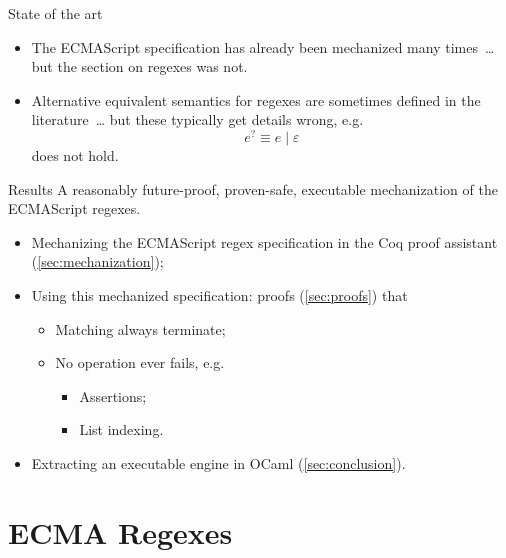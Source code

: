 \documentclass[aspectratio=169]{beamer}
\newcommand{\eps}[0]{\varepsilon}
\newcommand{\disj}[0]{\mathbin{|}}
\newcommand{\question}[0]{^{?}}
\begin{document}
    \begin{frame}{State of the art}
        \begin{itemize}
            \item The ECMAScript specification has already been mechanized many times~\cite{jscert,lambdajs,aplas_js,kjs}\ldots{}
            \pause{}
            but the section on regexes was not.
            \pause{}
            \item Alternative equivalent semantics for regexes are sometimes defined in the literature~\cite{expose,repair_dos}\ldots{}
            \pause{}
            but these typically get details wrong, e.g.
            \[e\question{} \equiv{} e \disj{} \eps{} \]
            does not hold.
        \end{itemize}
    \end{frame}

    \begin{frame}{Results}
        A reasonably future-proof, proven-safe, executable mechanization of the ECMAScript regexes.
        \pause{}
        \begin{itemize}
            \item Mechanizing the ECMAScript regex specification in the Coq proof assistant (\cref{sec:mechanization});
            \pause{}
            \item Using this mechanized specification: proofs (\cref{sec:proofs}) that
                \begin{itemize}
                    \item Matching always terminate;
                    \item No operation ever fails, e.g.
                        \begin{itemize}
                            \item Assertions;
                            \item List indexing.
                        \end{itemize}
                \end{itemize}
            \pause{}
            \item Extracting an executable engine in OCaml (\cref{sec:conclusion}).
        \end{itemize}
    \end{frame}

    \section{ECMA Regexes}
\end{document}
